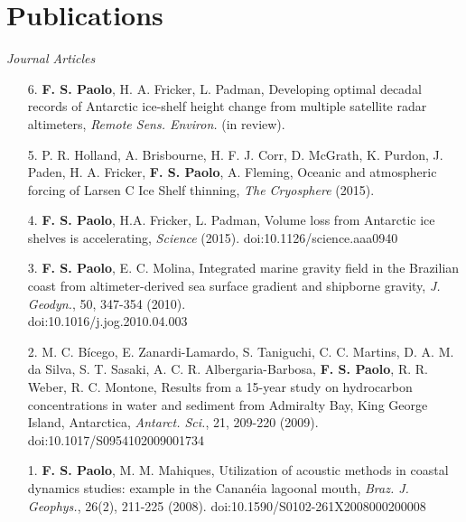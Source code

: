 \documentclass[a4paper,11pt]{article}
\begin{document}

\section{Publications}

\emph{Journal Articles}

\begin{enumerate}
  \item [6.] {\bf F. S. Paolo}, H. A. Fricker, L. Padman, Developing optimal decadal
        records of Antarctic ice-shelf height change from multiple satellite
        radar altimeters, {\it Remote Sens. Environ.} (in review).
  \item [5.] P. R. Holland, A. Brisbourne, H. F. J. Corr, D. McGrath, K. Purdon, 
        J. Paden, H. A. Fricker, {\bf F. S. Paolo}, A. Fleming, Oceanic and 
        atmospheric forcing of Larsen C Ice Shelf thinning, {\it The Cryosphere} 
        (2015).
  \item [4.] {\bf F. S. Paolo}, H.A. Fricker, L. Padman, Volume loss 
        from Antarctic ice shelves is accelerating, {\it Science} (2015).
        doi:10.1126/science.aaa0940
  \item [3.] {\bf F. S. Paolo}, E. C. Molina, Integrated marine 
        gravity field in the Brazilian coast from altimeter-derived sea 
        surface gradient and shipborne gravity, {\it J. Geodyn.}, 50, 347-354 (2010).\\
        doi:10.1016/j.jog.2010.04.003
  \item [2.] M. C. B\'icego, E. Zanardi-Lamardo, S. Taniguchi, C. C. Martins, 
        D. A. M. da Silva, S. T. Sasaki, A. C. R. Albergaria-Barbosa, {\bf F. S. 
        Paolo}, R. R. Weber, R. C. Montone, Results from a 15-year 
        study on hydrocarbon concentrations in water and sediment from 
        Admiralty Bay, King George Island, Antarctica, {\it Antarct. Sci.}, 
        21, 209-220 (2009).\\
        doi:10.1017/S0954102009001734
  \item [1.] {\bf F. S. Paolo}, M. M. Mahiques, Utilization of 
        acoustic methods in coastal dynamics studies: example in the 
        Canan\'eia lagoonal mouth, {\it Braz. J. Geophys.}, 26(2), 211-225 (2008).
        doi:10.1590/S0102-261X2008000200008
\end{enumerate}
\end{document}
